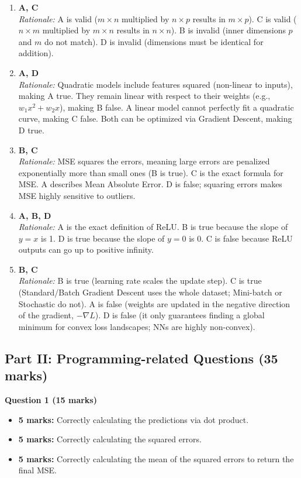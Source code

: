 \documentclass[11pt]{article}
\begin{document}
\begin{enumerate}
    \item \textbf{A, C}\\
    \textit{Rationale:} A is valid ($m \times n$ multiplied by $n \times p$ results in $m \times p$). C is valid ($n \times m$ multiplied by $m \times n$ results in $n \times n$). B is invalid (inner dimensions $p$ and $m$ do not match). D is invalid (dimensions must be identical for addition).

    \item \textbf{A, D}\\
    \textit{Rationale:} Quadratic models include features squared (non-linear to inputs), making A true. They remain linear with respect to their weights (e.g., $w_1x^2 + w_2x$), making B false. A linear model cannot perfectly fit a quadratic curve, making C false. Both can be optimized via Gradient Descent, making D true.

    \item \textbf{B, C}\\
    \textit{Rationale:} MSE squares the errors, meaning large errors are penalized exponentially more than small ones (B is true). C is the exact formula for MSE. A describes Mean Absolute Error. D is false; squaring errors makes MSE highly sensitive to outliers.

    \item \textbf{A, B, D}\\
    \textit{Rationale:} A is the exact definition of ReLU. B is true because the slope of $y=x$ is 1. D is true because the slope of $y=0$ is 0. C is false because ReLU outputs can go up to positive infinity.

    \item \textbf{B, C}\\
    \textit{Rationale:} B is true (learning rate scales the update step). C is true (Standard/Batch Gradient Descent uses the whole dataset; Mini-batch or Stochastic do not). A is false (weights are updated in the negative direction of the gradient, $-\nabla L$). D is false (it only guarantees finding a global minimum for convex loss landscapes; NNs are highly non-convex).
\end{enumerate}

\subsection*{Part II: Programming-related Questions (35 marks)}

\textbf{Question 1 (15 marks)}
\begin{itemize}
    \item \textbf{5 marks:} Correctly calculating the predictions via dot product.
    \item \textbf{5 marks:} Correctly calculating the squared errors.
    \item \textbf{5 marks:} Correctly calculating the mean of the squared errors to return the final MSE.
\end{itemize}
\end{document}
